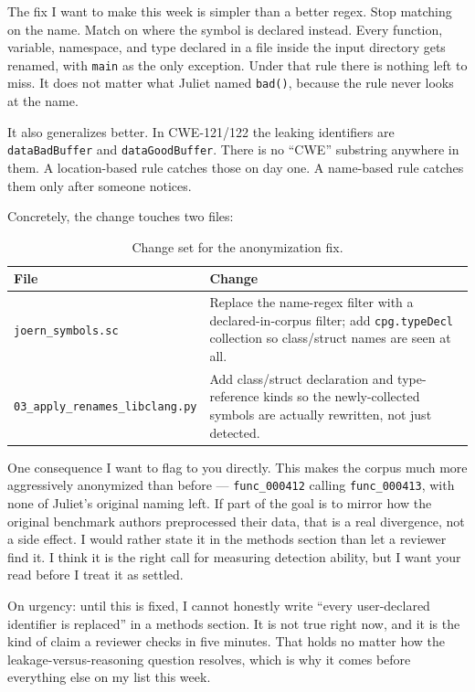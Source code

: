 \documentclass[11pt]{article}
\begin{document}
The fix I want to make this week is simpler than a better regex. Stop matching on the name. Match
on where the symbol is declared instead. Every function, variable, namespace, and type declared
in a file inside the input directory gets renamed, with \texttt{main} as the only exception.
Under that rule there is nothing left to miss. It does not matter what Juliet named
\texttt{bad()}, because the rule never looks at the name.

It also generalizes better. In CWE-121/122 the leaking identifiers are \texttt{dataBadBuffer} and
\texttt{dataGoodBuffer}. There is no ``CWE'' substring anywhere in them. A location-based rule
catches those on day one. A name-based rule catches them only after someone notices.

Concretely, the change touches two files:

\begin{table}[h!]
\centering
\begin{tabular}{>{\raggedright\arraybackslash}p{5.5cm}>{\raggedright\arraybackslash}p{9.2cm}}
\toprule
File & Change \\
\midrule
\texttt{joern\_symbols.sc} & Replace the name-regex filter with a declared-in-corpus filter;
add \texttt{cpg.typeDecl} collection so class/struct names are seen at all. \\
\addlinespace
\texttt{03\_apply\_\allowbreak renames\_\allowbreak libclang.py} & Add class/struct declaration
and type-reference kinds so the newly-collected symbols are actually rewritten, not just
detected. \\
\bottomrule
\end{tabular}
\caption{Change set for the anonymization fix.}
\end{table}

One consequence I want to flag to you directly. This makes the corpus much more aggressively
anonymized than before --- \texttt{func\_000412} calling \texttt{func\_000413}, with none of
Juliet's original naming left. If part of the goal is to mirror how the original benchmark
authors preprocessed their data, that is a real divergence, not a side effect. I would rather
state it in the methods section than let a reviewer find it. I think it is the right call for
measuring detection ability, but I want your read before I treat it as settled.

On urgency: until this is fixed, I cannot honestly write ``every user-declared identifier is
replaced'' in a methods section. It is not true right now, and it is the kind of claim a reviewer
checks in five minutes. That holds no matter how the leakage-versus-reasoning question resolves,
which is why it comes before everything else on my list this week.
\end{document}
